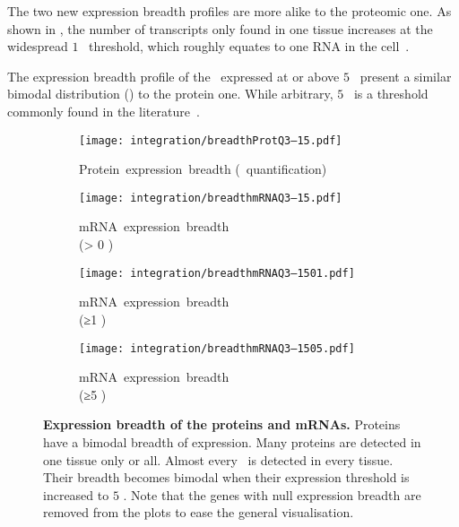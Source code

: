 The two new expression breadth profiles are more alike
to the proteomic one.
As shown in ,
the number of transcripts only found in one tissue increases
at the widespread $1$ \FPKM\ threshold,
which roughly equates to one \gls{RNA} in the cell~.

The expression breadth profile of the \mRNAs\ expressed at or above $5$ \FPKM\
present a similar bimodal distribution () to the protein one.
While arbitrary, $5$ \FPKM\ is a threshold commonly found
in the literature~.\\
\vspace{-\baselineskip}

\begin{figure}[!htb]
    \begin{subfigure}[h]{0.53\textwidth}
    \captionsetup{margin=0.6cm,justification=centering}
        \centering \texttt{[image: integration/breadthProtQ3--15.pdf]}
        \caption{Protein~expression~breadth (\PPKM~quantification)}\label{fig:protBreadth}
    \end{subfigure}
    \begin{subfigure}[h]{0.53\textwidth}
    \captionsetup{margin=0.6cm,justification=centering}
        \centering \texttt{[image: integration/breadthmRNAQ3--15.pdf]}
        \caption{mRNA~expression~breadth\\(> 0 \FPKM)}\label{fig:mRNAbreadth0}
    \end{subfigure}
    \vspace{2.5mm}

    \begin{subfigure}[b]{0.53\textwidth}
    \captionsetup{margin=0.6cm,justification=centering}
        \centering \texttt{[image: integration/breadthmRNAQ3--1501.pdf]}
        \caption{mRNA~expression~breadth\\(≥1 \FPKM)}\label{fig:mRNAbreadth1}
    \end{subfigure}
    \begin{subfigure}[b]{0.53\textwidth}
    \captionsetup{margin=0.6cm,justification=centering}
        \centering \texttt{[image: integration/breadthmRNAQ3--1505.pdf]}
        \caption{mRNA~expression~breadth\\(≥5 \FPKM)}\label{fig:mRNAbreadth5}
    \end{subfigure}
    \vspace{-5mm}
    \caption[Expression breadth of the proteins and mRNAs]{\label{fig:expressionBreadth}%
    \textbf{Expression breadth of the proteins and mRNAs.}
    Proteins have a bimodal breadth of expression.
    Many proteins are detected in one tissue only or all.
    Almost every \mRNA\ is detected in every tissue.
    Their breadth becomes bimodal when their expression threshold
    is increased to $5$ \FPKM{}.
    Note that the genes with null expression breadth are removed from the plots
    to ease the general visualisation.
    }
\end{figure}

